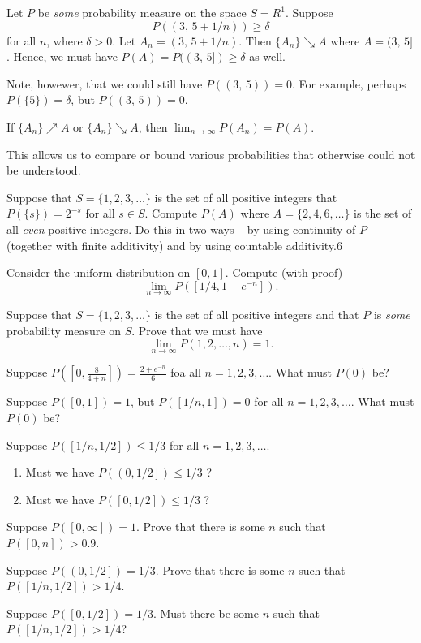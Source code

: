 \begin{example}
    Let $P$ be \emph{some} probability measure on the space $S=R^1$. Suppose
    $$
    P((3,\,5+1/n))\geqslant\delta
$$
for all $n$, where $\delta>0$. Let $A_n=(3,\,5+1/n)$. Then $\{A_n\}\searrow A$ where $A=(3,\,5]$. Hence, we must have $P(A)=P((3,\,5])\geqslant\delta$ as well.

Note, howewer, that we could still have $P((3,\,5))=0$. For example, perhaps $P(\{5\})=\delta$, but $P((3,\,5))=0$.
\end{example}

\begin{summary}
    \item If $\{A_n\}\nearrow A$ or $\{A_n\}\searrow A$, then $\lim_{n\to\infty}P(A_n)=P(A)$.
    \item This allows us to compare or bound various probabilities that otherwise could not be understood.
\end{summary}

\begin{exercises}
    \item Suppose that $S=\{1,2,3,\ldots\}$ is the set of all positive integers that $P(\{s\})=2^{-s}$ for all $s\in S$. Compute $P(A)$ where $A=\{2,4,6,\ldots\}$ is the set of all \emph{even} positive integers. Do this in two ways -- by using continuity of $P$ (together with finite additivity) and by using countable additivity.6
    \item Consider the uniform distribution on $[0,1]$. Compute (with proof)
        $$
            \lim_{n\to\infty}P([1/4, 1-e^{-n}]).
        $$
    \item Suppose that $S=\{1,2,3,\ldots\}$ is the set of all positive integers and that $P$ is \emph{some} probability measure on $S$. Prove that we must have
        $$
        \lim_{n\to\infty}P({1,2,\ldots,n})=1.
        $$
    \item Suppose $P([0, \frac{8}{4+n}])=\frac{2+e^{-n}}{6}$ foa all $n=1,2,3,\ldots$. What must $P({0})$ be?
    \item Suppose $P([0, 1]) = 1$, but $P([1/n,1])=0$ for all $n=1,2,3,\ldots$. What must $P({0})$ be?
    \item Suppose $P([1/n, 1/2])\leqslant1/3$ for all $n=1,2,3,\ldots$.
        \begin{enumerate}
            \item Must we have $P(\left(0,1/2\right]) \leqslant1/3$ ?
            \item Must we have $P([0, 1/2]) \leqslant1/3$ ?
        \end{enumerate}
    \item Suppose $P([0,\infty])=1$. Prove that there is some $n$ such that $P([0,n])>0.9$.
    \item Suppose $P(\left(0,1/2\right])=1/3$. Prove that there is some $n$ such that $P([1/n, 1/2]) > 1/4$.
    \item Suppose $P([0,1/2])=1/3$. Must there be some $n$ such that $P([1/n, 1/2])>1/4$?
\end{exercises}

